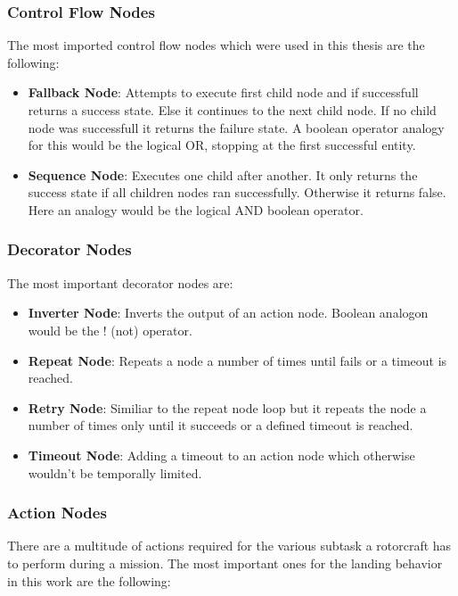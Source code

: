 \subsubsection{Control Flow Nodes}

The most imported control flow nodes which were used in this thesis are the following:

\begin{itemize}
    \item \textbf{Fallback Node}: Attempts to execute first child node and if successfull returns a success state. Else it continues to the next child node. If no child node was successfull it returns the failure state. A boolean operator analogy for this would be the logical OR, stopping at the first successful entity.
    \item \textbf{Sequence Node}: Executes one child after another. It only returns the success state if all children nodes ran successfully. Otherwise it returns false. Here an analogy would be the logical AND boolean operator.
\end{itemize}

\subsubsection{Decorator Nodes}\label{subsubsec:decorator_nodes}

The most important decorator nodes are:

\begin{itemize}
    \item \textbf{Inverter Node}: Inverts the output of an action node. Boolean analogon would be the ! (not) operator.
    \item \textbf{Repeat Node}: Repeats a node a number of times until fails or a timeout is reached. 
    \item \textbf{Retry Node}: Similiar to the repeat node loop but it repeats the node a number of times only until it succeeds or a defined timeout is reached.
    \item \textbf{Timeout Node}: Adding a timeout to an action node which otherwise wouldn't be temporally limited.
\end{itemize}

\subsubsection{Action Nodes}\label{subsubsec:setup:action_nodes}

There are a multitude of actions required for the various subtask a rotorcraft has to perform during a mission. The most important ones for the landing behavior in this work are the following:

